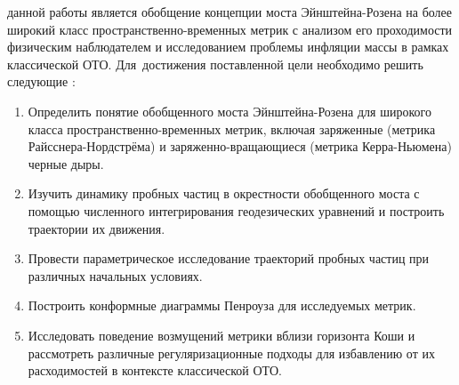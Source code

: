 


{\aim} данной работы является обобщение концепции моста Эйнштейна-Розена на более широкий класс пространственно-временных метрик с анализом его проходимости физическим наблюдателем и исследованием проблемы инфляции массы в рамках классической ОТО.
Для~достижения поставленной цели необходимо решить следующие {\tasks}:
\begin{enumerate}[beginpenalty=10000] %
  \item Определить понятие обобщенного моста Эйнштейна-Розена для широкого класса пространственно-временных метрик, включая заряженные (метрика Райсснера-Нордстрёма) и заряженно-вращающиеся (метрика Керра-Ньюмена) черные дыры.
  \item Изучить динамику пробных частиц в окрестности обобщенного моста с помощью численного интегрирования геодезических уравнений и построить траектории их движения.
  \item Провести параметрическое исследование траекторий пробных частиц при различных начальных условиях.
  \item Построить конформные диаграммы Пенроуза для исследуемых метрик.
  \item Исследовать поведение возмущений метрики вблизи горизонта Коши и рассмотреть различные регуляризационные подходы для избавлению от их расходимостей в контексте классической ОТО.
\end{enumerate}


